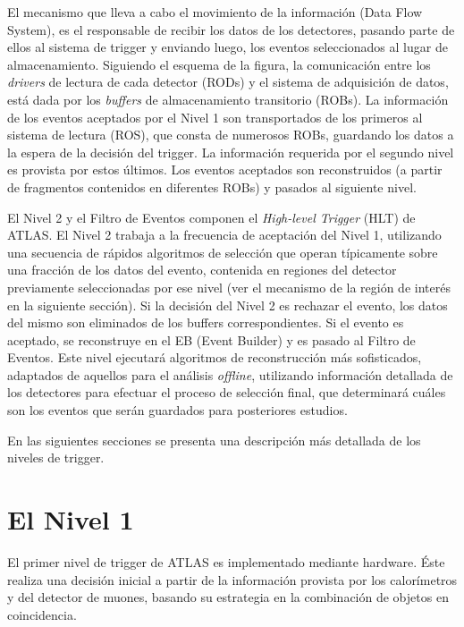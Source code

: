    El mecanismo que lleva a cabo el movimiento de la informaci\'on (Data Flow System), es el responsable de recibir los datos de los detectores, pasando parte de ellos al sistema de trigger y enviando luego, los eventos seleccionados al lugar de almacenamiento. Siguiendo el esquema de la figura, la comunicaci\'on entre los \emph{drivers} de lectura %
de cada detector (RODs) y el sistema de adquisici\'on de datos, est\'a dada por los \emph{buffers} de almacenamiento transitorio (ROBs). La informaci\'on de los eventos aceptados por el Nivel 1 son transportados de los primeros al sistema de lectura (ROS), que consta de numerosos ROBs, guardando los datos a la espera de la decisi\'on del trigger. La informaci\'on requerida por el segundo nivel es provista por estos \'ultimos. Los eventos aceptados son reconstruidos (a partir de fragmentos contenidos en diferentes ROBs) y pasados al siguiente nivel.

   El Nivel 2 y el Filtro de Eventos componen el \emph{High-level Trigger} (HLT) de ATLAS. El Nivel 2 trabaja a la frecuencia de aceptaci\'on del Nivel 1, utilizando una secuencia de r\'apidos algoritmos de selecci\'on que operan t\'ipicamente sobre una fracci\'on de los datos del evento, contenida en regiones del detector previamente seleccionadas por ese nivel (ver el mecanismo de la regi\'on de inter\'es en la siguiente secci\'on). Si la decisi\'on del Nivel 2 es rechazar el evento, los datos del mismo son eliminados de los buffers correspondientes. Si el evento es aceptado,  se reconstruye  en el EB (Event Builder) y es pasado al Filtro de Eventos. Este nivel ejecutar\'a algoritmos de reconstrucci\'on m\'as sofisticados, adaptados de aquellos para el an\'alisis \emph{offline}, utilizando informaci\'on detallada de los detectores para efectuar el proceso de selecci\'on final, que determinar\'a cu\'ales son los eventos que ser\'an guardados para posteriores estudios.

  En las siguientes secciones se presenta una descripci\'on m\'as detallada de los niveles de trigger.

 
\section{El Nivel 1}

   El primer nivel de trigger de ATLAS es implementado mediante hardware. \'Este realiza una decisi\'on inicial a partir de la informaci\'on provista por los calor\'imetros y del detector de muones, basando su estrategia en la combinaci\'on de objetos en coincidencia. %
  
